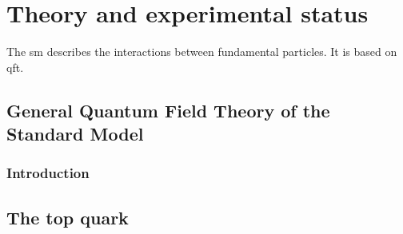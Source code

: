 \chapter{Theory and experimental status}

The \gls{sm} describes the interactions between fundamental particles. It is based on \gls{qft}. 

\section{General Quantum Field Theory of the Standard Model}
\subsection{Introduction}


\section{The top quark}